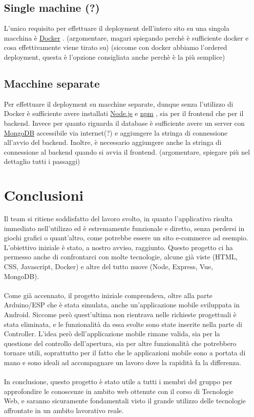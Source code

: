 \documentclass[a4paper,12pt]{report}
\newcommand{\node}{\href{https://nodejs.org/it/}{Node.js} }
\newcommand{\npm}{\href{https://www.npmjs.com/}{npm} }
\newcommand{\mongodb}{\href{https://www.mongodb.com/it-it}{MongoDB} }
\newcommand{\docker}{\href{https://www.docker.com/}{Docker} }
\begin{document}
\section{Single machine (?)}
L'unico requisito per effettuare il deployment dell'intero sito su una singola macchina è \docker. (argomentare, magari spiegando perchè è sufficiente docker e cosa effettivamente viene tirato su)
(siccome con docker abbiamo l'ordered deployment, questa è l'opzione consigliata anche perchè è la più semplice)

\section{Macchine separate}
Per effettuare il deployment su macchine separate, dunque senza l'utilizzo di Docker è sufficiente avere installati \node e \npm, sia per il frontend che per il backend. Invece per quanto riguarda il database è sufficiente avere un server con \mongodb accessibile via internet(?) e aggiungere la stringa di connessione all'avvio del backend. Inoltre, è necessario aggiungere anche la stringa di connessione al backend quando si avvia il frontend.
(argomentare, spiegare più nel dettaglio tutti i passaggi)

\clearpage
\chapter{Conclusioni}

Il team si ritiene soddisfatto del lavoro svolto, in quanto l'applicativo risulta immediato nell'utilizzo ed è estremamente funzionale e diretto, senza perdersi in giochi grafici o quant'altro, come potrebbe essere un sito e-commerce ad esempio. L'obiettivo iniziale è stato, a nostro avviso, raggiunto. Questo progetto ci ha permesso anche di confrontarci con molte tecnologie, alcune già viste (HTML, CSS, Javascript, Docker) e altre del tutto nuove (Node, Express, Vue, MongoDB).\\\\
Come già accennato, il progetto iniziale comprendeva, oltre alla parte Arduino/ESP che è stata simulata, anche un'applicazione mobile sviluppata in Android. Siccome però quest'ultima non rientrava nelle richieste progettuali è stata eliminata, e le funzionalità da essa svolte sono state inserite nella parte di Controller. L'idea però dell'applicazione mobile rimane valida, sia per la questione del controllo dell'apertura, sia per altre funzionalità che potrebbero tornare utili, soprattutto per il fatto che le applicazioni mobile sono a portata di mano e sono ideali ad accompagnare un lavoro dove la rapidità fa la differenza.\\\\
In conclusione, questo progetto è stato utile a tutti i membri del gruppo per approfondire le conoscenze in ambito web ottenute con il corso di Tecnologie Web, e saranno sicuramente fondamentali visto il grande utilizzo delle tecnologie affrontate in un ambito lavorativo reale.
\end{document}
